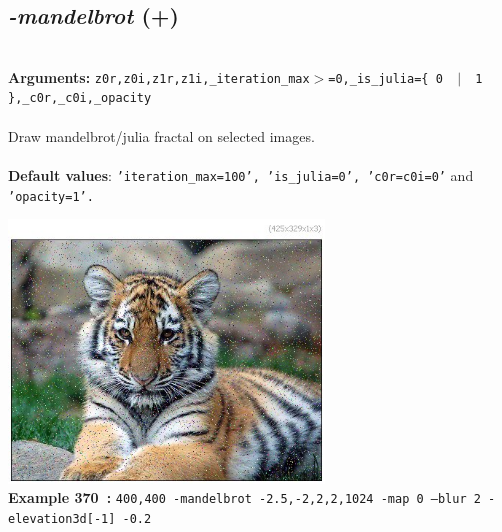 \documentclass[a4paper,11pt,twoside]{book}
\begin{document}
\subsection{\emph{-mandelbrot} (+)}\vspace*{-0.5em}
~\\\textbf{Arguments: } 
{\small \texttt{z0r,z0i,z1r,z1i,\_iteration\_max$>$=0,\_is\_julia=\{ 0 ~$|$~ 1 \},\_c0r,\_c0i,\_opacity}}\\~\\
Draw mandelbrot/julia fractal on selected images.
~\\~\\\textbf{Default values}: {\small \texttt{'iteration\_max=100', 'is\_julia=0', 'c0r=c0i=0'} and \texttt{'opacity=1'.}}
\begin{center}\includegraphics[keepaspectratio=true,height=7cm,width=\textwidth]{img/gmic_def370.jpg}\\
{\footnotesize \textbf{Example 370~:} \texttt{400,400 -mandelbrot -2.5,-2,2,2,1024 -map 0 --blur 2 -elevation3d[-1] -0.2}}
\end{center}
\end{document}
